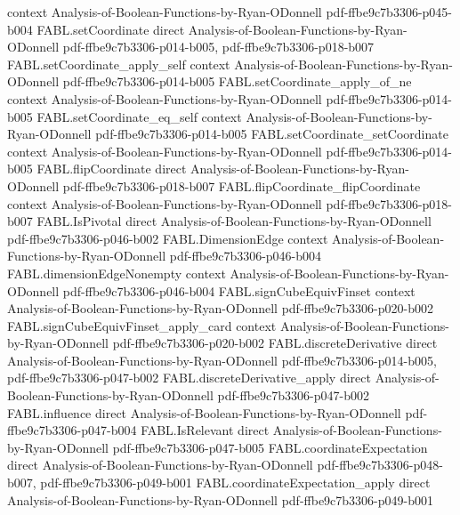 \begin{theorem}
  {context}
  {Analysis-of-Boolean-Functions-by-Ryan-ODonnell}
  {pdf-ffbe9c7b3306-p045-b004}
\proofstep
  {FABL.setCoordinate}
  {direct}
  {Analysis-of-Boolean-Functions-by-Ryan-ODonnell}
  {pdf-ffbe9c7b3306-p014-b005,
    pdf-ffbe9c7b3306-p018-b007}
\proofstep
  {FABL.setCoordinate_apply_self}
  {context}
  {Analysis-of-Boolean-Functions-by-Ryan-ODonnell}
  {pdf-ffbe9c7b3306-p014-b005}
\proofstep
  {FABL.setCoordinate_apply_of_ne}
  {context}
  {Analysis-of-Boolean-Functions-by-Ryan-ODonnell}
  {pdf-ffbe9c7b3306-p014-b005}
\proofstep
  {FABL.setCoordinate_eq_self}
  {context}
  {Analysis-of-Boolean-Functions-by-Ryan-ODonnell}
  {pdf-ffbe9c7b3306-p014-b005}
\proofstep
  {FABL.setCoordinate_setCoordinate}
  {context}
  {Analysis-of-Boolean-Functions-by-Ryan-ODonnell}
  {pdf-ffbe9c7b3306-p014-b005}
\proofstep
  {FABL.flipCoordinate}
  {direct}
  {Analysis-of-Boolean-Functions-by-Ryan-ODonnell}
  {pdf-ffbe9c7b3306-p018-b007}
\proofstep
  {FABL.flipCoordinate_flipCoordinate}
  {context}
  {Analysis-of-Boolean-Functions-by-Ryan-ODonnell}
  {pdf-ffbe9c7b3306-p018-b007}
\proofstep
  {FABL.IsPivotal}
  {direct}
  {Analysis-of-Boolean-Functions-by-Ryan-ODonnell}
  {pdf-ffbe9c7b3306-p046-b002}
\proofstep
  {FABL.DimensionEdge}
  {context}
  {Analysis-of-Boolean-Functions-by-Ryan-ODonnell}
  {pdf-ffbe9c7b3306-p046-b004}
\proofstep
  {FABL.dimensionEdgeNonempty}
  {context}
  {Analysis-of-Boolean-Functions-by-Ryan-ODonnell}
  {pdf-ffbe9c7b3306-p046-b004}
\proofstep
  {FABL.signCubeEquivFinset}
  {context}
  {Analysis-of-Boolean-Functions-by-Ryan-ODonnell}
  {pdf-ffbe9c7b3306-p020-b002}
\proofstep
  {FABL.signCubeEquivFinset_apply_card}
  {context}
  {Analysis-of-Boolean-Functions-by-Ryan-ODonnell}
  {pdf-ffbe9c7b3306-p020-b002}
\proofstep
  {FABL.discreteDerivative}
  {direct}
  {Analysis-of-Boolean-Functions-by-Ryan-ODonnell}
  {pdf-ffbe9c7b3306-p014-b005,
    pdf-ffbe9c7b3306-p047-b002}
\proofstep
  {FABL.discreteDerivative_apply}
  {direct}
  {Analysis-of-Boolean-Functions-by-Ryan-ODonnell}
  {pdf-ffbe9c7b3306-p047-b002}
\proofstep
  {FABL.influence}
  {direct}
  {Analysis-of-Boolean-Functions-by-Ryan-ODonnell}
  {pdf-ffbe9c7b3306-p047-b004}
\proofstep
  {FABL.IsRelevant}
  {direct}
  {Analysis-of-Boolean-Functions-by-Ryan-ODonnell}
  {pdf-ffbe9c7b3306-p047-b005}
\proofstep
  {FABL.coordinateExpectation}
  {direct}
  {Analysis-of-Boolean-Functions-by-Ryan-ODonnell}
  {pdf-ffbe9c7b3306-p048-b007,
    pdf-ffbe9c7b3306-p049-b001}
\proofstep
  {FABL.coordinateExpectation_apply}
  {direct}
  {Analysis-of-Boolean-Functions-by-Ryan-ODonnell}
  {pdf-ffbe9c7b3306-p049-b001}

\end{theorem}

